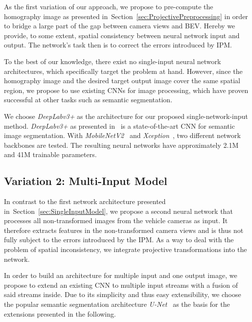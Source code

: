 \documentclass[a4paper, 10pt, conference]{ieeeconf}
\newcommand{\sect}[1]{Section~\ref{#1}}
\begin{document}
As the first variation of our approach, we propose to pre-compute the homography image as presented in~\sect{sec:ProjectivePreprocessing} in order to bridge a large part of the gap between camera views and BEV. Hereby we provide, to some extent, spatial consistency between neural network input and output. The network's task then is to correct the errors introduced by IPM.

To the best of our knowledge, there exist no single-input neural network architectures, which specifically target the problem at hand. However, since the homography image and the desired target output image cover the same spatial region, we propose to use existing CNNs for image processing, which have proven successful at other tasks such as semantic segmentation.

We choose \textit{DeepLabv3+} as the architecture for our proposed single-network-input method. \textit{DeepLabv3+} as presented in~\cite{ChenEtAl_EncoderDecoderAtrousSeparable_2018} is a state-of-the-art CNN for semantic image segmentation. With \textit{MobileNetV2}~\cite{SandlerEtAl_MobileNetV2InvertedResiduals_2018} and \textit{Xception}~\cite{Chollet_XceptionDeepLearning_2017}, two different network backbones are tested. The resulting neural networks have approximately 2.1M and 41M trainable parameters.

\subsection{Variation 2: Multi-Input Model}\label{sec:MultiInputModel}

In contrast to the first network architecture presented in~\sect{sec:SingleInputModel}, we propose a second neural network that processes all non-transformed images from the vehicle cameras as input. It therefore extracts features in the non-transformed camera views and is thus not fully subject to the errors introduced by the IPM. As a way to deal with the problem of spatial inconsistency, we integrate projective transformations into the network.

In order to build an architecture for multiple input and one output image, we propose to extend an existing CNN to multiple input streams with a fusion of said streams inside. Due to its simplicity and thus easy extensibility, we choose the popular semantic segmentation architecture \textit{U-Net}~\cite{RonnebergerEtAl_UNetConvolutionalNetworks_2015} as the basis for the extensions presented in the following.
\end{document}
